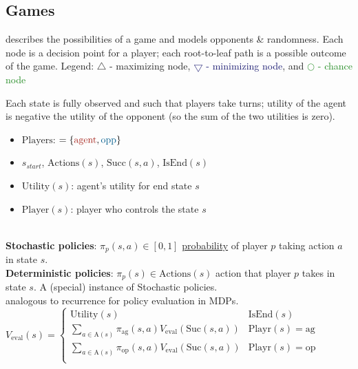 \newcommand{\agentcolor}[1]{\textcolor{Mahogany}{#1}}
\newcommand{\oppcolor}[1]{\textcolor{MidnightBlue}{#1}}
\newcommand{\chancecolor}[1]{\textcolor{ForestGreen}{#1}}
\newcommand{\dcolor}[1]{\textcolor{Fuchsia}{#1}}

\subsection{Games}

 describes the possibilities of a game and models opponents \&
randomness. Each node is a decision point for a player; each root-to-leaf path
is a possible outcome of the game.  Legend: \agentcolor{$\bigtriangleup$ -
maximizing node}, \oppcolor{$\bigtriangledown$ - minimizing node}, and
\chancecolor{$\bigcirc$ - chance node}

 Each state is fully observed and such that
players take turns; utility of the agent is negative the utility of the opponent
(so the sum of the two utilities is zero).
\begin{itemize}
    \item $\text{Players}$: $ = \{\agentcolor{\text{agent}}, \oppcolor{\text{opp}}\}$
    \item $s_{start}$, $\text{Actions}(s)$, $\text{Succ}(s, a)$, $\text{IsEnd}(s)$
    \item $\text{Utility}(s)$: agent's utility for end state $s$
    \item $\text{Player}(s)$: player who controls the state $s$
\end{itemize}

\\
\textbf{Stochastic policies}: $\pi_{p}(s, a) \in \left[0, 1\right]$
\underline{probability} of player $p$ taking action $a$ in state $s$.\\
\textbf{Deterministic policies}: $\pi_{p}(s) \in \text{Actions}(s)$ action that
player $p$ takes in state $s$. A (special) instance of Stochastic policies.\\

 analogous to recurrence for policy evaluation in MDPs.
$V_{\text{eval}}(s) = \begin{cases}
    \text{Utility}(s) & \text{IsEnd}(s) \\
    \sum_{a \in \text{A}(s)} \pi_{\text{ag}}(s, a) V_{\text{eval}}(\text{Suc}(s, a)) & \text{Playr}(s) = \text{ag} \\
    \sum_{a \in \text{A}(s)} \pi_{\text{op}}(s, a) V_{\text{eval}}(\text{Suc}(s, a)) & \text{Playr}(s) = \text{op} \\
\end{cases}$

